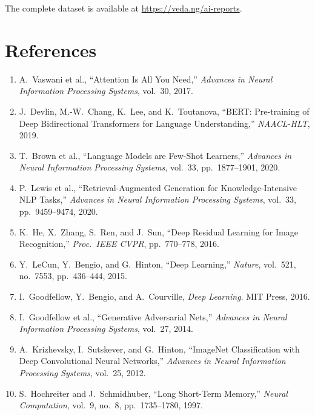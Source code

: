 \documentclass[11pt]{article}
\begin{document}
The complete dataset is available at \url{https://veda.ng/ai-reports}.

\section*{References}

\begin{enumerate}
\item A.\ Vaswani et al., ``Attention Is All You Need,'' \textit{Advances in Neural Information Processing Systems}, vol.\ 30, 2017.

\item J.\ Devlin, M.-W.\ Chang, K.\ Lee, and K.\ Toutanova, ``BERT: Pre-training of Deep Bidirectional Transformers for Language Understanding,'' \textit{NAACL-HLT}, 2019.

\item T.\ Brown et al., ``Language Models are Few-Shot Learners,'' \textit{Advances in Neural Information Processing Systems}, vol.\ 33, pp.\ 1877--1901, 2020.

\item P.\ Lewis et al., ``Retrieval-Augmented Generation for Knowledge-Intensive NLP Tasks,'' \textit{Advances in Neural Information Processing Systems}, vol.\ 33, pp.\ 9459--9474, 2020.

\item K.\ He, X.\ Zhang, S.\ Ren, and J.\ Sun, ``Deep Residual Learning for Image Recognition,'' \textit{Proc.\ IEEE CVPR}, pp.\ 770--778, 2016.

\item Y.\ LeCun, Y.\ Bengio, and G.\ Hinton, ``Deep Learning,'' \textit{Nature}, vol.\ 521, no.\ 7553, pp.\ 436--444, 2015.

\item I.\ Goodfellow, Y.\ Bengio, and A.\ Courville, \textit{Deep Learning}. MIT Press, 2016.

\item I.\ Goodfellow et al., ``Generative Adversarial Nets,'' \textit{Advances in Neural Information Processing Systems}, vol.\ 27, 2014.

\item A.\ Krizhevsky, I.\ Sutskever, and G.\ Hinton, ``ImageNet Classification with Deep Convolutional Neural Networks,'' \textit{Advances in Neural Information Processing Systems}, vol.\ 25, 2012.

\item S.\ Hochreiter and J.\ Schmidhuber, ``Long Short-Term Memory,'' \textit{Neural Computation}, vol.\ 9, no.\ 8, pp.\ 1735--1780, 1997.


\end{enumerate}
\end{document}
